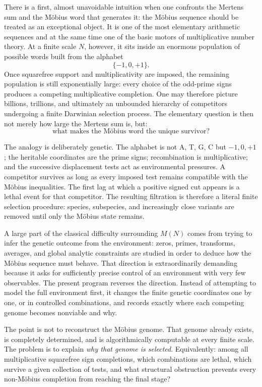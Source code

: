 \documentclass[11pt]{article}
\theoremstyle{definition}
\theoremstyle{remark}
\begin{document}
There is a first, almost unavoidable intuition when one confronts the Mertens sum and the M\"obius word that generates it: the M\"obius sequence should be treated as an exceptional object.  It is one of the most elementary arithmetic sequences and at the same time one of the basic motors of multiplicative number theory.  At a finite scale $N$, however, it sits inside an enormous population of possible words built from the alphabet
\[
 \{-1,0,+1\}.
\]
Once squarefree support and multiplicativity are imposed, the remaining population is still exponentially large: every choice of the odd-prime signs produces a competing multiplicative completion.  One may therefore picture billions, trillions, and ultimately an unbounded hierarchy of competitors undergoing a finite Darwinian selection process.  The elementary question is then not merely how large the Mertens sum is, but:
\[
 \boxed{\text{what makes the M\"obius word the unique survivor?}}
\]

The analogy is deliberately genetic.  The alphabet is not A, T, G, C but $-1,0,+1$; the heritable coordinates are the prime signs; recombination is multiplicative; and the successive displacement tests act as environmental pressures.  A competitor survives as long as every imposed test remains compatible with the M\"obius inequalities.  The first lag at which a positive signed cut appears is a lethal event for that competitor.  The resulting filtration is therefore a literal finite selection procedure: species, subspecies, and increasingly close variants are removed until only the M\"obius state remains.

A large part of the classical difficulty surrounding $M(N)$ comes from trying to infer the genetic outcome from the environment: zeros, primes, transforms, averages, and global analytic constraints are studied in order to deduce how the M\"obius sequence must behave.  That direction is extraordinarily demanding because it asks for sufficiently precise control of an environment with very few observables.  The present program reverses the direction.  Instead of attempting to model the full environment first, it changes the finite genetic coordinates one by one, or in controlled combinations, and records exactly where each competing genome becomes nonviable and why.

The point is not to reconstruct the M\"obius genome.  That genome already exists, is completely determined, and is algorithmically computable at every finite scale.  The problem is to explain \emph{why that genome is selected}.  Equivalently: among all multiplicative squarefree sign completions, which combinations are lethal, which survive a given collection of tests, and what structural obstruction prevents every non-M\"obius completion from reaching the final stage?
\end{document}
